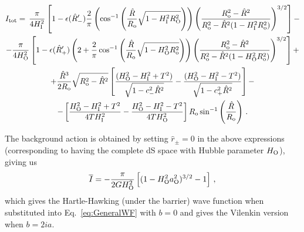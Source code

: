 \documentclass[a4paper,11pt]{article}
\numberwithin{equation}{section}
\begin{document}
\begin{small}
\begin{equation}
\begin{gathered}
\label{eq:B1i}
I_{\rm tot} = \, \frac{\pi}{4H_{\rm I}^{2}}\left[1-\epsilon(\hat R^{\prime}_{-}) \frac{2}{\pi} \left(\cos^{-1}\left(\frac{\hat R}{R_{\rm o}}\sqrt{1 - H_{\rm I}^{2} R_{\rm O}^{2}}\right)\right)\left(\frac{R_{\rm o}^{2} - \hat R^{2}}{R_{\rm o}^{2} - \hat R^{2}(1 - H_{\rm I}^{2} R_{\rm o}^{2})}\right)^{3/2}\right] - \\  
- \frac{\pi}{4 H_{\rm O}^{2}} \left[1 - \epsilon(\hat R^{\prime}_{+}) \left(2 + \frac{2}{\pi} \cos^{-1}\left(\frac{\hat R}{R_{\rm o}}\sqrt{1-H_{\rm O}^{2} R_{\rm o}^{2}}\right)\right)\left(\frac{R_{\rm o}^{2}-\hat R^{2}}{R_{\rm o}^{2} - \hat R^{2}(1 - H_{\rm O}^{2} R_{\rm o}^{2})}\right)^{3/2} \right] + \\ 
+ \frac{\hat R^{3}}{2 R_{\rm o}} \sqrt{R_{\rm o}^{2} - \hat R^{2}}  \left[\frac{(H_{\rm O}^{2} - H_{\rm I}^{2} + T^{2})}{\sqrt{1 - c_{-}^{2}\hat R^{2}}} - \frac{(H_{\rm O}^{2} - H_{\rm I}^{2}-T^{2})}{\sqrt{1 - c_{+}^{2}\hat R^{2}}}\right] - \\
- \left[\frac{H_{\rm O}^{2} - H_{\rm I}^{2} + T^{2}}{4 T H_{\rm I}^{2}} - \frac{H_{\rm O}^{2} - H_{\rm I}^{2} - T^{2}}{4 T H_{\rm O}^{2}}\right] R_{\rm o} \sin^{-1} \left(\frac{\hat R}{R_{\rm o}}\right) \,.
\end{gathered}
\end{equation}
\end{small}






The background action is obtained by setting $\hat{r}_{\pm}=0$ in the above expressions (corresponding to having the complete dS space with Hubble parameter $H_{\rm O}$), giving us
\begin{equation}
\overline{I} = -\frac{\pi}{2 G H_{\rm O}^{2}}\left[(1 - H_{\rm O}^{2} a_{\rm O}^{2})^{3/2} - 1 \right] \,,\label{eq:HHV}
\end{equation}
which gives the Hartle-Hawking (under the barrier) wave function when
substituted into Eq.~\eqref{eq:GeneralWF} with $b=0$ and gives the Vilenkin version when $b=2ia$.
\end{document}
